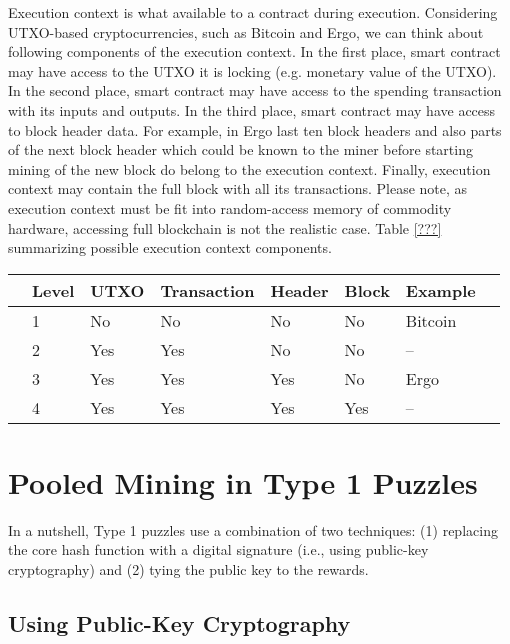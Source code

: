 \documentclass[11pt]{article}
\newcommand{\authnote}[2]{\marginpar{\parbox{\marginparwidth}{\tiny %
  \textsf{#1 {\textcolor{blue}{notes: #2}}}}}%
  \textcolor{blue}{\textbf{\dag}}}
\newcommand{\authnote}[2]{
  \textsf{#1 \textcolor{blue}{: #2}}}
\newcommand{\authnote}[2]{}
\newcommand{\snote}[1]{{\authnote{\textcolor{red}{Scalahub notes}}{#1}}}
\newcommand{\powname}{Autolykos\xspace}
\begin{document}
Execution context is what available to a contract during execution. Considering UTXO-based cryptocurrencies, such as
Bitcoin and Ergo, we can think about following components of the execution context. In the first place, smart contract
 may have access to the UTXO it is locking (e.g. monetary value of the UTXO). In the second place, smart contract may
 have access to the spending transaction with its inputs and outputs. In the third place, smart contract may have access
 to block header data. For example, in Ergo last ten block headers and also parts of the next block header which could
 be known to the miner before starting mining of the new block do belong to the execution context. Finally, execution
 context may contain the full block with all its transactions. Please note, as execution context must be fit into
 random-access memory of commodity hardware, accessing full blockchain is not the realistic case. Table \ref{???}
 summarizing possible execution context components.


\begin{tabular}{llllllll}
	& Level & UTXO & Transaction & Header      & Block & Example \\ \hline
	& 1     & No  & No          & No  		   & No    & Bitcoin \\
	& 2     & Yes & Yes         & No 		   & No    & -- \\
	& 3     & Yes & Yes         & Yes 		   & No    & Ergo    \\
	& 4     & Yes & Yes         & Yes 		   & Yes   & --    \\
\end{tabular}
	
\section{Pooled Mining in Type 1 Puzzles}


In a nutshell, Type 1 puzzles use a combination of two techniques: (1) replacing the core hash function with a digital signature (i.e., using public-key cryptography) and (2) tying the public key to the rewards.

\subsection{Using Public-Key Cryptography}
\end{document}
